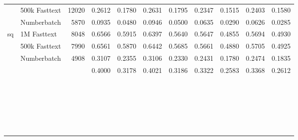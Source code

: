 \begin{table}[]
\begin{tabular}{@{}lllllllllll@{}}
 & 500k Fasttext & \multicolumn{1}{r}{12020} & 0.2612 & 0.1780 & 0.2631 & 0.1795 & 0.2347 & 0.1515 & 0.2403 & 0.1580 \\
 & Numberbatch & \multicolumn{1}{r}{5870} & 0.0935 & 0.0480 & 0.0946 & 0.0500 & 0.0635 & 0.0290 & 0.0626 & 0.0285 \\
\multirow{3}{*}{sq} & 1M Fasttext & \multicolumn{1}{r}{8048} & 0.6566 & 0.5915 & 0.6397 & 0.5640 & 0.5647 & 0.4855 & 0.5694 & 0.4930 \\
 & 500k Fasttext & \multicolumn{1}{r}{7990} & 0.6561 & 0.5870 & 0.6442 & 0.5685 & 0.5661 & 0.4880 & 0.5705 & 0.4925 \\
 & Numberbatch & \multicolumn{1}{r}{4908} & 0.3107 & 0.2355 & 0.3106 & 0.2330 & 0.2431 & 0.1780 & 0.2474 & 0.1835 \\
 &  &  & 0.4000 & 0.3178 & 0.4021 & 0.3186 & 0.3322 & 0.2583 & 0.3368 & 0.2612 \\
 &  &  &  &  &  &  &  &  &  &  \\
 &  &  &  &  &  &  &  &  &  &  \\
 &  &  &  &  &  &  &  &  &  &  \\
 &  &  &  &  &  &  &  &  &  &  \\
 &  &  &  &  &  &  &  &  &  &  \\
 &  &  &  &  &  &  &  &  &  &  \\
 &  &  &  &  &  &  &  &  &  &  \\
 &  &  &  &  &  &  &  &  &  &  \\
 &  &  &  &  &  &  &  &  &  &  \\
 &  &  &  &  &  &  &  &  &  &  \\
 &  &  &  &  &  &  &  &  &  &  \\
 &  &  &  &  &  &  &  &  &  &  \\
 &  &  &  &  &  &  &  &  &  &  \\
 &  &  &  &  &  &  &  &  &  &  \\
 &  &  &  &  &  &  &  &  &  &  \\
 &  &  &  &  &  &  &  &  &  &  \\
 &  &  &  &  &  &  &  &  &  &  \\
 &  &  &  &  &  &  &  &  &  &  \\
 &  &  &  &  &  &  &  &  &  &  \\
 &  &  &  &  &  &  &  &  &  &  \\
 &  &  &  &  &  &  &  &  &  &  \\
 &  &  &  &  &  &  &  &  &  &  \\
 &  &  &  &  &  &  &  &  &  &  \\

\end{tabular}
\end{table}
